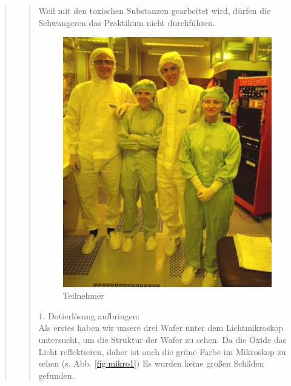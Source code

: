 \begin{quote}
\begin{quote}
		Weil mit den toxischen Substanzen gearbeitet wird, dürfen die 
		Schwangeren das Praktikum nicht durchführen.
	
		\vspace{2em}
            
            \begin{figure}[H]
				\hspace{4.8 cm}
                \includegraphics[scale=0.5, trim = 0cm 0cm 0cm 0cm,clip]
                	{./HerstellungBilder/Teilnehmer.png}
                  \caption{Teilnehmer}
                \label{fig:teiln}
            \end{figure}
            
    	\vspace{2em}
    
    	1. Dotierlösung aufbringen:\\
    
		Als erstes haben wir unsere drei Wafer unter dem Lichtmikroskop 
		untersucht, um die Struktur der Wafer zu sehen. Da die Oxide das Licht 
		reflektieren, daher ist auch die grüne Farbe im Mikroskop zu sehen 
		(s. Abb. \ref{fig:mikro1}) Es wurden keine großen Schäden gefunden.
    

\end{quote}
\end{quote}
